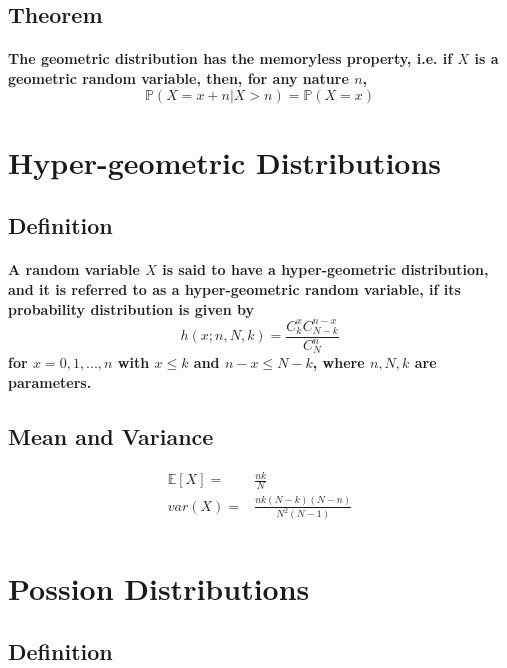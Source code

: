 \documentclass[titlepage]{article}
\begin{document}
        \subsection*{Theorem}
            \paragraph{
                The geometric distribution has the memoryless property, i.e. if $X$ is a geometric random variable, then, for any nature $n$,
                $$\mathbb{P}(X=x+n|X>n)=\mathbb{P}(X=x)$$
            }
    \section{Hyper-geometric Distributions}
        \subsection*{Definition}
            \paragraph{
                A random variable $X$ is said to have a hyper-geometric distribution, and it is referred to as a hyper-geometric random variable, if its probability distribution is given by 
                $$h(x;n,N,k)=\frac{C_k^xC_{N-k}^{n-x}}{C_N^n}$$
                for $x=0,1,...,n$ with $x\leq k$ and $n-x\leq N-k$, where $n,N,k$ are parameters.
            }
        \subsection*{Mean and Variance}  
            \begin{equation*}
                \begin{split}
                    \mathbb{E}[X]=&\frac{nk}{N}\\
                    var(X)=&\frac{nk(N-k)(N-n)}{N^2(N-1)}\\
                \end{split}
            \end{equation*}

    \section{Possion Distributions}
        \subsection*{Definition}
\end{document}

